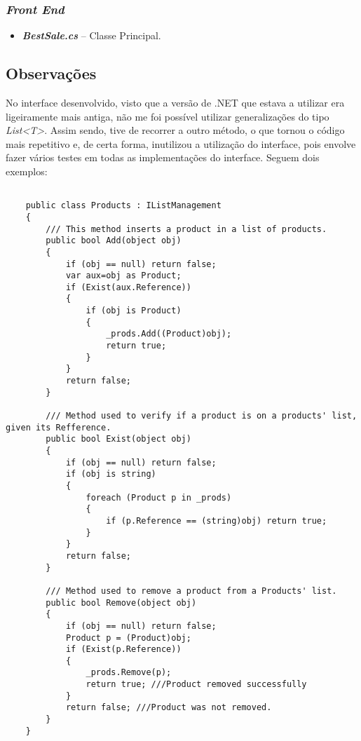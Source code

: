 \documentclass[11pt]{scrartcl} %
\begin{document}
\subsubsection{\textit{Front End}}
\begin{itemize}
	\item 
	\emph{\textbf{BestSale.cs}} -- Classe Principal.
\end{itemize}


\subsection{Observações}

No interface desenvolvido, visto que a versão de .NET que estava a utilizar era ligeiramente mais antiga, não me foi possível utilizar generalizações do tipo \textit{List<T>}. Assim sendo, tive de recorrer a outro método, o que tornou o código mais repetitivo e, de certa forma, inutilizou a utilização do interface, pois envolve fazer vários testes em todas as implementações do interface. Seguem dois exemplos:

\begin{lstlisting}[language={[Sharp]C}, caption={Implementação do Interface}, label={Implementação do Interface}]
	
	public class Products : IListManagement
	{
		/// This method inserts a product in a list of products.
		public bool Add(object obj)
		{
			if (obj == null) return false;
			var aux=obj as Product;
			if (Exist(aux.Reference))
			{
				if (obj is Product)
				{
					_prods.Add((Product)obj);
					return true;
				}
			}
			return false;
		}
		
		/// Method used to verify if a product is on a products' list, given its Refference.
		public bool Exist(object obj)
		{
			if (obj == null) return false;
			if (obj is string)
			{
				foreach (Product p in _prods)
				{
					if (p.Reference == (string)obj) return true;
				}
			}
			return false;
		}
		
		/// Method used to remove a product from a Products' list.
		public bool Remove(object obj)
		{
			if (obj == null) return false;
			Product p = (Product)obj;
			if (Exist(p.Reference))
			{
				_prods.Remove(p);
				return true; ///Product removed successfully
			}
			return false; ///Product was not removed.
		}
	}
\end{lstlisting}
\end{document}
